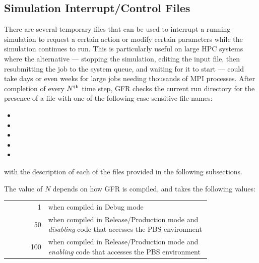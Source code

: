 \subsection{Simulation Interrupt\slash Control Files}
\label{SEC:Files:Interrupt}

There are several temporary files that can be used to interrupt a running
simulation to request a certain action or modify certain parameters while the
simulation continues to run.
%
This is particularly useful on large HPC systems where the alternative ---
stopping the simulation, editing the input file, then resubmitting the job to
the system queue, and waiting for it to start --- could take days or even weeks
for large jobs needing thousands of MPI processes.
%
After completion of every $N\textsuperscript{th}$ time step, GFR checks the current run
directory for the presence of a file with one of the following case-sensitive
file names:
%
\begin{itemize}
  \item {}
  \item {}
  \item {}
  \item {}
  \item {}
\end{itemize}
%
with the description of each of the files provided in the following subsections.


The value of $N$ depends on how GFR is compiled, and takes the following
values:
%
\\[1.5ex]
\begin{tabular}{ @{\qquad$N$ = } r @{\quad} p{0.8\linewidth} @{} }
  1 & when compiled in Debug mode \\
  50 & when compiled in Release\slash Production mode and \emph{disabling} code
  that accesses the PBS environment \\
  100 & when compiled in Release\slash Production mode and \emph{enabling} code
  that accesses the PBS environment
\end{tabular}
\\[1.5ex]

